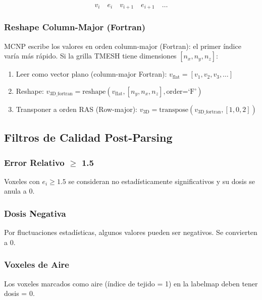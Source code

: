 \documentclass[12pt,a4paper]{article}
\begin{document}
$$v_i \quad e_i \quad v_{i+1} \quad e_{i+1} \quad \ldots$$


\subsubsection{Reshape Column-Major (Fortran)}

MCNP escribe los valores en orden column-major (Fortran): el primer índice varía más rápido. Si la grilla TMESH tiene dimensiones $[n_x, n_y, n_z]$:

\begin{enumerate}
  \item Leer como vector plano (column-major Fortran): $v_{\text{flat}} = [v_1, v_2, v_3, \ldots]$
  \item Reshape: $v_{\text{3D\_fortran}} = \text{reshape}(v_{\text{flat}}, [n_y, n_x, n_z], \text{order=`F'})$
  \item Transponer a orden RAS (Row-major): $v_{\text{3D}} = \text{transpose}(v_{\text{3D\_fortran}}, [1, 0, 2])$
\end{enumerate}

\subsection{Filtros de Calidad Post-Parsing}

\subsubsection{Error Relativo $\geq$ 1.5}

Voxeles con $e_i \geq 1.5$ se consideran no estadísticamente significativos y su dosis se anula a 0.

\subsubsection{Dosis Negativa}

Por fluctuaciones estadísticas, algunos valores pueden ser negativos. Se convierten a 0.

\subsubsection{Voxeles de Aire}

Los voxeles marcados como aire (índice de tejido = 1) en la labelmap deben tener dosis = 0.
\end{document}
